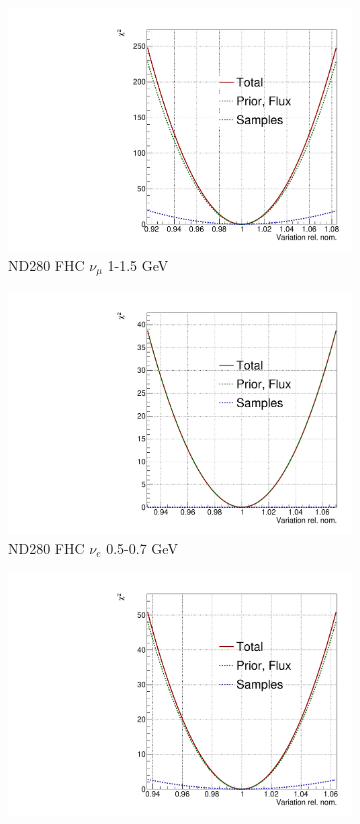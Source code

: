 \begin{figure}[!htbp]
\centering
\begin{subfigure}{.49\textwidth}
  \centering
  \includegraphics[width=0.7\linewidth]{figs/llh/b_5_llh.pdf}
  \caption{ND280 FHC $\nu_{\mu}$ 1-1.5 GeV}
\end{subfigure}
\begin{subfigure}{.49\textwidth}
  \centering
  \includegraphics[width=0.7\linewidth]{figs/llh/b_12_llh.pdf}
  \caption{ND280 FHC $\nu_{e}$ 0.5-0.7 GeV}
\end{subfigure}
\begin{subfigure}{.49\textwidth}
  \centering
  \includegraphics[width=0.7\linewidth]{figs/llh/b_36_llh.pdf}

\end{subfigure}
\end{figure}
